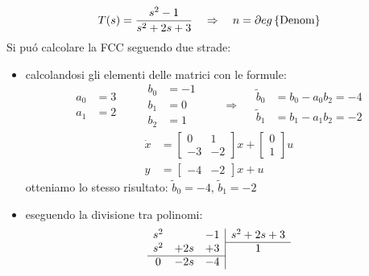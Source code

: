 \documentclass[../main.tex]{subfiles}
\begin{document}
		\begin{mdframed}[style=Exercise]
			\begin{Exercise}[title={Calcolare la forma compagna controllabile}, difficulty=1]
				\[
					T(s) = \dfrac{s^2-1}{s^2+2s+3} \quad\Rightarrow\quad n = \partial eg \left\lbrace \text{Denom} \right\rbrace
				\]
				Si pu\'o calcolare la FCC seguendo due strade:
				\begin{itemize}
					\item 
						calcolandosi gli elementi delle matrici con le formule:
						\[
							\begin{aligned}
								a_0 &= 3\\
								a_1 &= 2
							\end{aligned}
							\qquad
							\begin{aligned}
								b_0 &= -1\\
								b_1 &= 0\\
								b_2 &= 1
							\end{aligned}
							\qquad\Rightarrow\quad
							\begin{aligned}
								\tilde b_0 &= b_0 - a_0 b_2 = -4\\
								\tilde b_1 &= b_1 - a_1 b_2 = -2
							\end{aligned}
						\]
						\[
							\begin{aligned}
								\dot x &= 
								\begin{bmatrix}
									0 & 1\\
									-3 & -2
								\end{bmatrix} x+
								\begin{bmatrix}
									0\\
									1
								\end{bmatrix} u
								\\
								y &=
								\begin{bmatrix}
									-4 & -2
								\end{bmatrix} x + u
							\end{aligned}
						\]
						otteniamo lo stesso risultato: $ \tilde b_0 = -4 $, $ \tilde b_1 = -2 $
					\item 
						eseguendo la divisione tra polinomi:
						\[
							\begin{array}{ccc|c}
								s^2 & & -1 & s^2 + 2s + 3
								\\\cline{4-4}
								s^2 & +2s & +3 & 1
								\\\cline{1-3}
								0 & -2s & -4 &
							\end{array}
						\]
				\end{itemize} 
			\end{Exercise}
		\end{mdframed}
\end{document}
